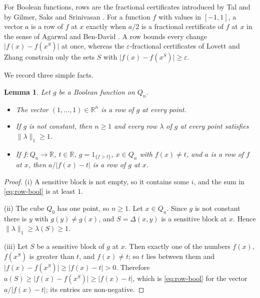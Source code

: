 \documentclass[11pt,reqno]{amsart}
\newtheorem{lemma}[theorem]{Lemma}
\theoremstyle{definition}
\theoremstyle{remark}
\numberwithin{equation}{section}
\theoremstyle{named}
\theoremstyle{plain}
\newcommand{\R}{\mathbb{R}}
\newcommand{\eps}{\varepsilon}
\newcommand{\norm}[1]{\lVert #1\rVert_1}
\newcommand{\abs}[1]{\lvert #1\rvert}
\begin{document}
For Boolean functions, rows are the fractional certificates introduced by Tal \cite{Tal} and by
Gilmer, Saks and Srinivasan \cite{GSS}. For a function $f$ with values in $[-1,1]$, a vector $a$ is a
row of $f$ at $x$ exactly when $a/2$ is a fractional certificate of $f$ at $x$ in the sense of
Agarwal and Ben-David \cite[Section~3.1]{ABD}. A row bounds every change $\abs{f(x)-f(x^{S})}$ at
once, whereas the $\eps$-fractional certificates of Lovett and Zhang \cite{LZ} constrain only the
sets $S$ with $\abs{f(x)-f(x^{S})}\ge\eps$.

We record three simple facts.

\begin{lemma}\label{lem:rows-basic}
Let $g$ be a Boolean function on $Q_n$.
\begin{itemize}
\item[(i)] The vector $(1,\dots,1)\in\R^{n}$ is a row of $g$ at every point.
\item[(ii)] If $g$ is not constant, then $n\ge 1$ and every row $\lambda$ of $g$ at every point
satisfies $\norm{\lambda}\ge 1$.
\item[(iii)] If $f\colon Q_n\to\R$, $t\in\R$, $g=1_{\{f>t\}}$, $x\in Q_n$ with $f(x)\ne t$, and $a$ is
a row of $f$ at $x$, then $a/\abs{f(x)-t}$ is a row of $g$ at $x$.
\end{itemize}
\end{lemma}

\begin{proof}
(i) A sensitive block is not empty, so it contains some $i$, and the sum in \eqref{eq:row-bool} is at
least $1$.

(ii) The cube $Q_0$ has one point, so $n\ge1$. Let $x\in Q_n$. Since $g$ is not constant there is
$y$ with $g(y)\ne g(x)$, and $S=\Delta(x,y)$ is a sensitive block at $x$. Hence
$\norm{\lambda}\ge\lambda(S)\ge 1$.

(iii) Let $S$ be a sensitive block of $g$ at $x$. Then exactly one of the numbers $f(x)$, $f(x^{S})$
is greater than $t$, and $f(x)\ne t$; so $t$ lies between them and
$\abs{f(x)-f(x^{S})}\ge\abs{f(x)-t}>0$. Therefore
$a(S)\ge\abs{f(x)-f(x^{S})}\ge\abs{f(x)-t}$, which is \eqref{eq:row-bool} for the vector
$a/\abs{f(x)-t}$; its entries are non-negative.
\end{proof}
\end{document}
